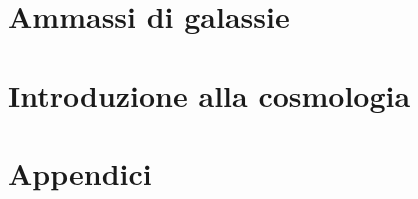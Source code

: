 \documentclass[]{book}
\begin{document}
\chapter{Ammassi di galassie}

\chapter{Introduzione alla cosmologia}

%

\appendix
\chapter{Appendici}



\end{document}
